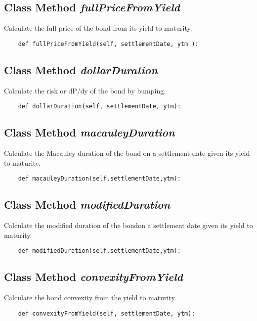 \documentclass[twoside,11pt]{book}
\begin{document}
\subsection{Class Method {\it fullPriceFromYield}}
Calculate the full price of the bond from its yield to maturity. 

\begin{lstlisting}
    def fullPriceFromYield(self, settlementDate, ytm ):
\end{lstlisting}

\subsection{Class Method {\it dollarDuration}}
Calculate the risk or dP/dy of the bond by bumping. 

\begin{lstlisting}
    def dollarDuration(self, settlementDate, ytm):
\end{lstlisting}

\subsection{Class Method {\it macauleyDuration}}
Calculate the Macauley duration of the bond on a settlement date given its yield to maturity. 

\begin{lstlisting}
    def macauleyDuration(self,settlementDate,ytm):
\end{lstlisting}

\subsection{Class Method {\it modifiedDuration}}
Calculate the modified duration of the bondon a settlement date given its yield to maturity. 

\begin{lstlisting}
    def modifiedDuration(self,settlementDate,ytm):
\end{lstlisting}

\subsection{Class Method {\it convexityFromYield}}
Calculate the bond convexity from the yield to maturity. 

\begin{lstlisting}
    def convexityFromYield(self, settlementDate, ytm):
\end{lstlisting}
\end{document}
